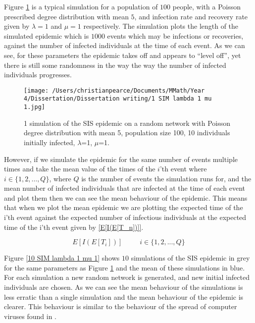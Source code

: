 \documentclass{uonmathsreport}
\begin{document}
Figure \ref{1 SIM lambda 1 mu 1} is a typical simulation for a population of $100$ people, with a Poisson prescribed degree distribution with mean $5$, and infection rate and recovery rate given by $\lambda=1$ and $\mu=1$ respectively. The simulation plots the length of the simulated epidemic which is $1000$ events which may be infections or recoveries, against the number of infected individuals at the time of each event. As we can see, for these parameters the epidemic takes off and appears to “level off”, yet there is still some randomness in the way the way the number of infected individuals progresses. 

\begin{figure}
\begin{center}
\texttt{[image: /Users/christianpearce/Documents/MMath/Year 4/Dissertation/Dissertation writing/1 SIM lambda 1 mu 1.jpg]}
\end{center}
\caption{1 simulation of the SIS epidemic on a random network with Poisson degree distribution with mean 5, population size 100, 10 individuals initially infected, $\lambda$=1, $\mu$=1.}
\label{1 SIM lambda 1 mu 1}
\end{figure}

However, if we simulate the epidemic for the same number of events multiple times and take the mean value of the times of the $i$’th event where $i \in \{1,2,…,Q\}$, where $Q$ is the number of events the simulation runs for, and the mean number of infected individuals that are infected at the time of each event and plot them then we can see the mean behaviour of the epidemic. This means that when we plot the mean epidemic we are plotting the expected time of the i'th event  against the expected number of infectious individuals at the expected time of the i'th event given by \eqref{E[I(E[T_n])]}.

\begin{equation}\label{E[I(E[T_n])]}
E[I(E[T_i])]\,\,\,\,\,\,\,\,\,\,\,\,\,\,\, i \in \{1,2,...,Q\}
\end{equation}


Figure \ref{10 SIM lambda 1 mu 1} shows $10$ simulations of the SIS epidemic in grey for the same parameters as Figure \ref{1 SIM lambda 1 mu 1} and the mean of these simulations in blue. For each simulation a new random network is generated, and new initial infected individuals are chosen. As we can see the mean behaviour of the simulations is less erratic than a single simulation and the mean behaviour of the epidemic is clearer. This behaviour is similar to the behaviour of the spread of computer viruses found in \cite{bibkephart}.
\end{document}
